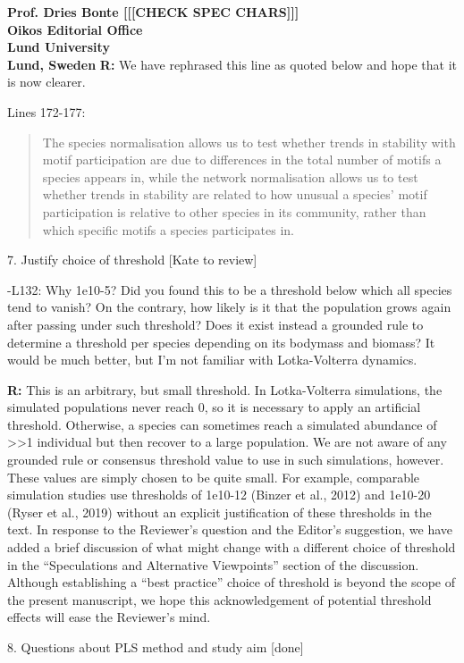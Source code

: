 \documentclass[12pt]{letter}
\begin{document}
\begin{letter}{\bf Prof. Dries Bonte [[[CHECK SPEC CHARS]]]\\
Oikos Editorial Office \\
Lund University \\
Lund, Sweden}
      \textbf{R:} We have rephrased this line as quoted below and hope that it is now clearer.

    
        Lines 172-177:
        
        \begin{quotation}
    		The species normalisation allows us to test whether trends in stability with motif participation are due to differences in the total number of motifs a species appears in, while the network normalisation allows us to test whether trends in stability are related to how unusual a species' motif participation is relative to other species in its community, rather than which specific motifs a species participates in.
        \end{quotation}


    7. Justify choice of threshold [Kate to review]

        -L132: Why 1e10-5? Did you found this to be a threshold below which all species tend to vanish? On the contrary, how likely is it that the population grows again after passing under such threshold? Does it exist instead a grounded rule to determine a threshold per species depending on its bodymass and biomass? It would be much better, but I’m not familiar with Lotka-Volterra dynamics.

        \textbf{R:} This is an arbitrary, but small threshold. In Lotka-Volterra simulations, the simulated populations never reach 0, so it is necessary to apply an artificial threshold. Otherwise, a species can sometimes reach a simulated abundance of >>1 individual but then recover to a large population.
        We are not aware of any grounded rule or consensus threshold value to use in such simulations, however. These values are simply chosen to be quite small. For example, comparable simulation studies use thresholds of 1e10-12 (Binzer et al., 2012) and 1e10-20 (Ryser et al., 2019) without an explicit justification of these thresholds in the text. 
        In response to the Reviewer's question and the Editor's suggestion, we have added a brief discussion of what might change with a different choice of threshold in the ``Speculations and Alternative Viewpoints'' section of the discussion. 
        Although establishing a ``best practice'' choice of threshold is beyond the scope of the present manuscript, we hope this acknowledgement of potential threshold effects will ease the Reviewer's mind.
        

    8. Questions about PLS method and study aim [done]


\end{letter}
\end{document}
